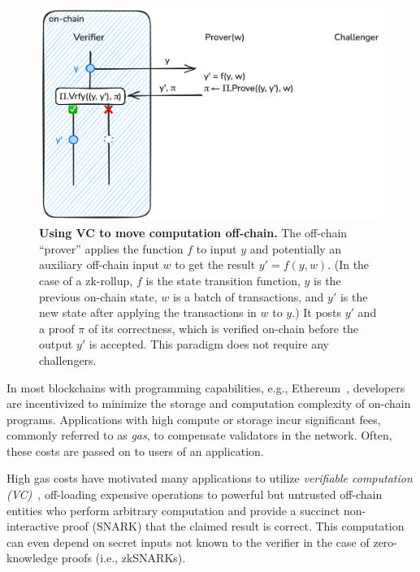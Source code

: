  \begin{figure}[tbh]
    \includegraphics[width=\textwidth]{naysayer/figs/vc.png}
    \caption{\textbf{Using VC to move computation off-chain.} The off-chain ``prover'' applies the function $f$ to input $y$ and potentially an auxiliary off-chain input $w$ to get the result $y' = f(y, w)$. (In the case of a zk-rollup, $f$ is the state transition function, $y$ is the previous on-chain state, $w$ is a batch of transactions, and $y'$ is the new state after applying the transactions in $w$ to $y$.) It posts $y'$ and a proof $\pi$ of its correctness, which is verified on-chain before the output $y'$ is accepted. This paradigm does not require any challengers.}
    \label{fig:vc}
 \end{figure}

In most blockchains with programming capabilities, e.g., Ethereum~\cite{ethereum_yellowpaper}, developers are incentivized to minimize the storage and computation complexity of on-chain programs. Applications with high compute or storage incur significant fees, commonly referred to as \emph{gas}, to compensate validators in the network. Often, these costs are passed on to users of an application. 

High gas costs have motivated many applications to utilize \emph{verifiable computation (VC)}~\cite{C:GenGenPar10}, off-loading expensive operations to powerful but untrusted off-chain entities who perform arbitrary computation and provide a succinct non-interactive proof (SNARK) that the claimed result is correct.
This computation can even depend on secret inputs not known to the verifier in the case of zero-knowledge proofs (i.e., zkSNARKs).

